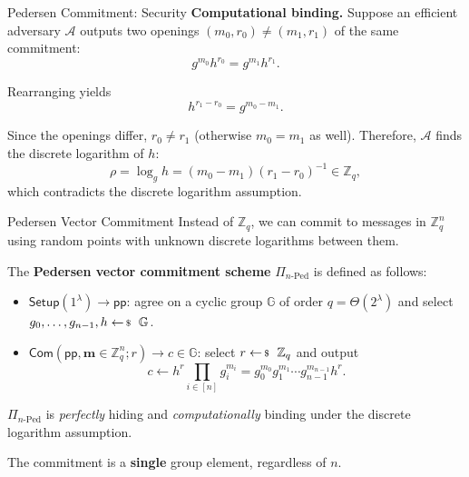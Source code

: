\documentclass{zkdl-presentation-template}
\begin{document}
    \begin{frame}{Pedersen Commitment: Security}
        \textbf{Computational binding.} Suppose an efficient adversary $\mathcal{A}$ outputs two openings $(m_0, r_0) \neq (m_1, r_1)$ of the same commitment:
        \begin{equation*}
            g^{m_0}h^{r_0} = g^{m_1}h^{r_1}.
        \end{equation*}
        \pause

        Rearranging yields
        \begin{equation*}
            h^{r_1 - r_0} = g^{m_0 - m_1}.
        \end{equation*}
        \pause

        Since the openings differ, $r_0 \neq r_1$ (otherwise $m_0 = m_1$ as well). Therefore, $\mathcal{A}$ finds the discrete logarithm of $h$:
        \begin{equation*}
            \rho = \log_g h = (m_0 - m_1)(r_1 - r_0)^{-1} \in \mathbb{Z}_q,
        \end{equation*}
        which contradicts the discrete logarithm assumption.
    \end{frame}

    \begin{frame}{Pedersen Vector Commitment}
        \small
        Instead of $\mathbb{Z}_q$, we can commit to messages in $\mathbb{Z}_q^n$ using random points with unknown discrete logarithms between them.

        \begin{definition}
            The \textbf{Pedersen vector commitment scheme} $\Pi_{n\text{-Ped}}$ is defined as follows:
            \begin{itemize}
                \item $\mathsf{Setup}(1^{\lambda}) \to \mathsf{pp}$: agree on a cyclic group $\mathbb{G}$ of order $q = \Theta(2^{\lambda})$ and select $g_0, \dots, g_{n-1}, h \leftarrowS \mathbb{G}$.\pause
                \item $\mathsf{Com}(\mathsf{pp}, \mathbf{m} \in \mathbb{Z}_q^n; r) \to c \in \mathbb{G}$: select $r \leftarrowS \mathbb{Z}_q$ and output
                \begin{equation*}
                    c \gets h^r \prod_{i \in [n]} g_i^{m_i} = g_0^{m_0}g_1^{m_1}\cdots g_{n-1}^{m_{n-1}}h^r.
                \end{equation*}
            \end{itemize}
        \end{definition}
        \pause

        \begin{lemma}
            $\Pi_{n\text{-Ped}}$ is \emph{perfectly} hiding and \emph{computationally} binding under the discrete logarithm assumption.
        \end{lemma}
        The commitment is a \textbf{single} group element, regardless of $n$.
    \end{frame}
\end{document}
